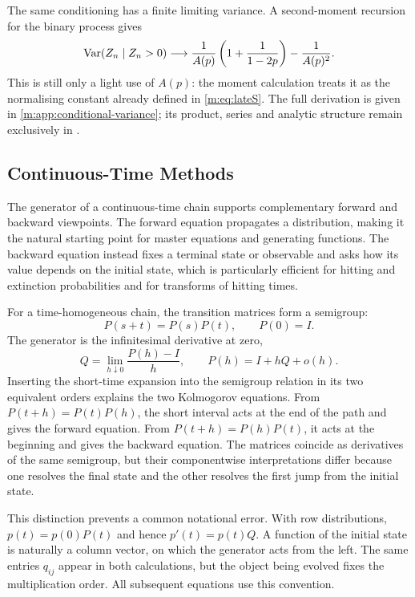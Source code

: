 The same conditioning has a finite limiting variance.  A second-moment recursion
for the binary process gives
\begin{equation}
  \operatorname{Var}\!\left(Z_n\mid Z_n>0\right)\longrightarrow
  \frac{1}{A(p)}\left(1+\frac{1}{1-2p}\right)
  -\frac{1}{A(p)^2}.
  \label{m:eq:discrete-conditional-variance}
\end{equation}
This is still only a light use of $A(p)$: the moment calculation treats it as the
normalising constant already defined in \cref{m:eq:lateS}.  The full derivation is
given in \cref{m:app:conditional-variance}; its product, series and analytic
structure remain exclusively in \ChA.

\subsection{Continuous-Time Methods}\label{m:sec:continuous-methods}

The generator of a continuous-time chain supports complementary forward and
backward viewpoints.  The forward equation propagates a distribution, making it
the natural starting point for master equations and generating functions.  The
backward equation instead fixes a terminal state or observable and asks how its
value depends on the initial state, which is particularly efficient for hitting
and extinction probabilities and for transforms of hitting times.

For a time-homogeneous chain, the transition matrices form a semigroup:
\begin{equation}
  P(s+t)=P(s)P(t),
  \qquad P(0)=I.
  \label{m:eq:ctmc-semigroup}
\end{equation}
The generator is the infinitesimal derivative at zero,
\begin{equation}
  Q=\lim_{h\downarrow0}\frac{P(h)-I}{h},
  \qquad P(h)=I+hQ+o(h).
  \label{m:eq:generator-semigroup-limit}
\end{equation}
Inserting the short-time expansion into the semigroup relation in its two
equivalent orders explains the two Kolmogorov equations.  From
$P(t+h)=P(t)P(h)$, the short interval acts at the end of the path and gives the
forward equation.  From $P(t+h)=P(h)P(t)$, it acts at the beginning and gives the
backward equation.  The matrices coincide as derivatives of the same semigroup,
but their componentwise interpretations differ because one resolves the final
state and the other resolves the first jump from the initial state.

This distinction prevents a common notational error.  With row distributions,
$p(t)=p(0)P(t)$ and hence $p'(t)=p(t)Q$.  A function of the initial state is
naturally a column vector, on which the generator acts from the left.  The same
entries $q_{ij}$ appear in both calculations, but the object being evolved fixes
the multiplication order.  All subsequent equations use this convention.

